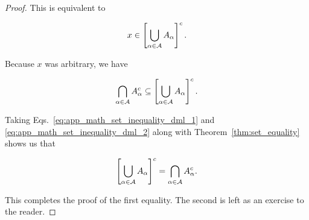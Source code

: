 \begin{proof}
\noindent
This is equivalent to

\begin{equation}
    x\in\left[ \bigcup_{\alpha\in\mathcal{A}} A_{\alpha} \right]^{c}.
\end{equation}

\noindent
Because $x$ was arbitrary, we have

\begin{equation}
    \bigcap_{\alpha\in\mathcal{A}} A_{\alpha}^{c} \subseteq
        \left[ \bigcup_{\alpha\in\mathcal{A}} A_{\alpha} \right]^{c}.
    \label{eq:app_math_set_inequality_dml_2}
\end{equation}

Taking Eqs.~\eqref{eq:app_math_set_inequality_dml_1}
and \eqref{eq:app_math_set_inequality_dml_2}
along with Theorem~\ref{thm:set_equality} shows us that

\begin{equation}
    \left[ \bigcup_{\alpha\in\mathcal{A}} A_{\alpha} \right]^{c}
        = \bigcap_{\alpha\in\mathcal{A}} A_{\alpha}^{c}.
\end{equation}

\noindent
This completes the proof of the first equality.
The second is left as an exercise to the reader.
\end{proof}
